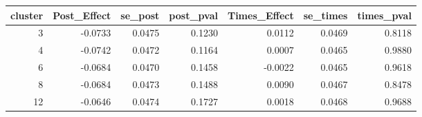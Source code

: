 \begin{tabular}{rrrrrrr}
\toprule
 cluster &  Post\_Effect &  se\_post &  post\_pval &  Times\_Effect &  se\_times &  times\_pval \\
\midrule
       3 &      -0.0733 &   0.0475 &     0.1230 &        0.0112 &    0.0469 &      0.8118 \\
       4 &      -0.0742 &   0.0472 &     0.1164 &        0.0007 &    0.0465 &      0.9880 \\
       6 &      -0.0684 &   0.0470 &     0.1458 &       -0.0022 &    0.0465 &      0.9618 \\
       8 &      -0.0684 &   0.0473 &     0.1488 &        0.0090 &    0.0467 &      0.8478 \\
      12 &      -0.0646 &   0.0474 &     0.1727 &        0.0018 &    0.0468 &      0.9688 \\
\bottomrule
\end{tabular}
